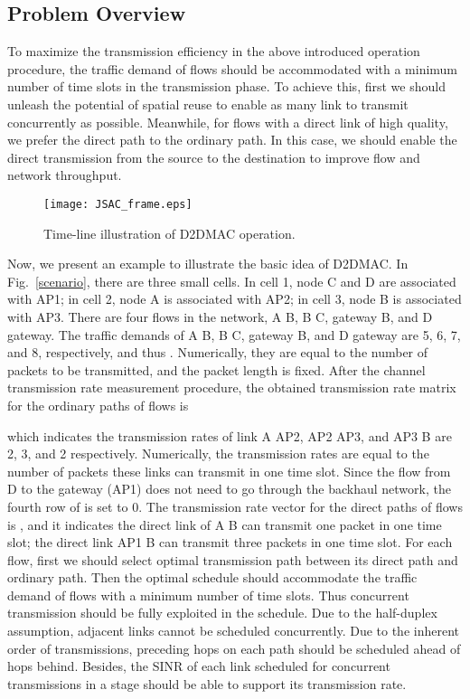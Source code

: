\documentclass[journal]{IEEEtran}
\begin{document}
\subsection{Problem Overview}\label{S3-2}

To maximize the transmission efficiency in the above introduced operation procedure, the traffic
demand of flows should be accommodated with a minimum number of time slots in the transmission
phase. To achieve this, first we should unleash the potential of spatial reuse to enable as many
link to transmit concurrently as possible. Meanwhile, for flows with a direct link of high quality,
we prefer the direct path to the ordinary path. In this case, we should enable the direct
transmission from the source to the destination to improve flow and network throughput.



\begin{figure} [htbp] \begin{center}
\texttt{[image: JSAC\_frame.eps]}
\end{center}
\caption{Time-line illustration of D2DMAC operation.} \label{frame}
\end{figure}



Now, we present an example to illustrate the basic idea of D2DMAC. In Fig.~\ref{scenario}, there
are three small cells. In cell 1, node C and D are associated with AP1; in cell 2, node A is
associated with AP2; in cell 3, node B is associated with AP3. There are four flows in the network,
A  B, B  C, gateway  B, and D  gateway. The traffic demands of A  B, B
 C, gateway  B, and D  gateway are 5, 6, 7, and 8, respectively, and thus
. Numerically, they are equal to the number of packets to be
transmitted, and the packet length is fixed. After the channel transmission rate measurement
procedure, the obtained transmission rate matrix for the ordinary paths of flows is

which indicates the transmission rates of link A  AP2, AP2  AP3, and AP3  B are 2,
3, and 2 respectively. Numerically, the transmission rates are equal to the number of packets these
links can transmit in one time slot. Since the flow from D to the gateway (AP1) does not need to go
through the backhaul network, the fourth row of  is set to 0. The transmission rate
vector for the direct paths of flows is , and it indicates the direct
link of A  B can transmit one packet in one time slot; the direct link AP1  B can
transmit three packets in one time slot. For each flow, first we should select optimal transmission
path between its direct path and ordinary path. Then the optimal schedule should accommodate the
traffic demand of flows with a minimum number of time slots. Thus concurrent transmission should be
fully exploited in the schedule. Due to the half-duplex assumption, adjacent links cannot be
scheduled concurrently. Due to the inherent order of transmissions, preceding hops on each path
should be scheduled ahead of hops behind. Besides, the SINR of each link scheduled for concurrent
transmissions in a stage should be able to support its transmission rate.
\end{document}
